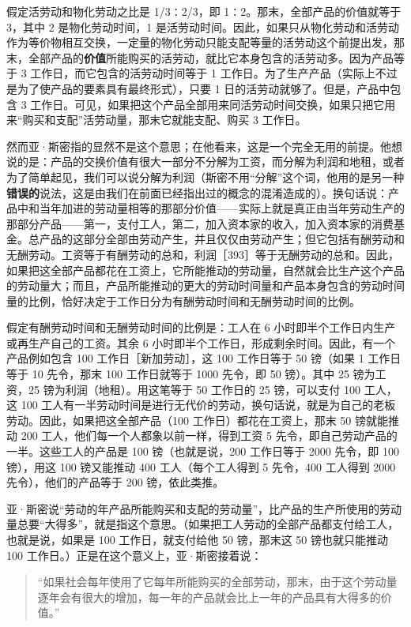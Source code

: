 假定活劳动和物化劳动之比是 1/3∶2/3，即 1∶2。那末，全部产品的价值就等于 3，其中 2 是物化劳动时间，1 是活劳动时间。因此，如果只从物化劳动和活劳动作为等价物相互交换，一定量的物化劳动只能支配等量的活劳动这个前提出发，那末，全部产品的\textbf{价值}所能购买的活劳动，就比它本身包含的活劳动多。因为产品等于 3 工作日，而它包含的活劳动时间等于 1 工作日。为了生产产品（实际上不过是为了使产品的要素具有最终形式），只要 1 日的活劳动就够了。但是，产品中包含 3 工作日。可见，如果把这个产品全部用来同活劳动时间交换，如果只把它用来“购买和支配”活劳动量，那末它就能支配、购买 3 工作日。

然而亚·斯密指的显然不是这个意思；在他看来，这是一个完全无用的前提。他想说的是：产品的交换价值有很大一部分不分解为工资，而分解为利润和地租，或者为了简单起见，我们可以说分解为利润（斯密不用“分解”这个词，他用的是另一种\textbf{错误的}说法，这是由我们在前面已经指出过的概念的混淆造成的）。换句话说：产品中和当年加进的劳动量相等的那部分价值——实际上就是真正由当年劳动生产的那部分产品——第一，支付工人，第二，加入资本家的收入，加入资本家的消费基金。总产品的这部分全部由劳动产生，并且仅仅由劳动产生；但它包括有酬劳动和无酬劳动。工资等于有酬劳动的总和，利润［393］等于无酬劳动的总和。因此，如果把这全部产品都花在工资上，它所能推动的劳动量，自然就会比生产这个产品的劳动量大；而且，产品所能推动的更大的劳动时间量和产品本身包含的劳动时间量的比例，恰好决定于工作日分为有酬劳动时间和无酬劳动时间的比例。

假定有酬劳动时间和无酬劳动时间的比例是：工人在 6 小时即半个工作日内生产或再生产自己的工资。其余 6 小时即半个工作日，形成剩余时间。因此，有一个产品例如包含 100 工作日［新加劳动］，这 100 工作日等于 50 镑（如果 1 工作日等于 10 先令，那末 100 工作日就等于 1000 先令，即 50 镑）。其中 25 镑为工资，25 镑为利润（地租）。用这笔等于 50 工作日的 25 镑，可以支付 100 工人，这 100 工人有一半劳动时间是进行无代价的劳动，换句话说，就是为自己的老板劳动。因此，如果把这全部产品（100 工作日）都花在工资上，那末 50 镑就能推动 200 工人，他们每一个人都象以前一样，得到工资 5 先令，即自己劳动产品的一半。这些工人的产品是 100 镑（也就是说，200 工作日等于 2000 先令，即 100 镑），用这 100 镑又能推动 400 工人（每个工人得到 5 先令，400 工人得到 2000 先令），他们的产品等于 200 镑，依此类推。

亚·斯密说“劳动的年产品所能购买和支配的劳动量”，比产品的生产所使用的劳动量总要“大得多”，就是指这个意思。（如果把工人劳动的全部产品都支付给工人，也就是说，如果是 100 工作日，就支付给他 50 镑，那末这 50 镑也就只能推动 100 工作日。）正是在这个意义上，亚·斯密接着说：

\begin{quote}“如果社会每年使用了它每年所能购买的全部劳动，那末，由于这个劳动量逐年会有很大的增加，每一年的产品就会比上一年的产品具有大得多的价值。”\end{quote}

